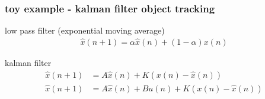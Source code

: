 \documentclass{beamer}
\begin{document}
\begin{frame}
  \frametitle{\bf toy example - kalman filter object tracking}

  low pass filter (exponential moving average)
  \begin{align*}
    \hat{x}(n+1) = \alpha \hat{x}(n) + (1 - \alpha)x(n)
  \end{align*}

  kalman filter
  \begin{align*}
    \hat{x}(n+1) & = A \hat{x}(n) + K( x(n) - \hat{x}(n)) \\
    \hat{x}(n+1) & = A \hat{x}(n) + Bu(n) + K( x(n) - \hat{x}(n))
  \end{align*}

\end{frame}
\end{document}
